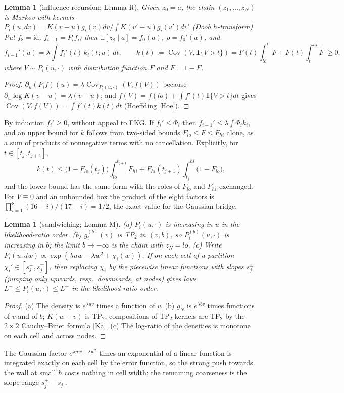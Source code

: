 \documentclass[11pt,a4paper]{article}
\newtheorem{lemma}[theorem]{Lemma}
\theoremstyle{definition}
\theoremstyle{remark}
\newcommand{\E}{\mathbb{E}}
\newcommand{\Cov}{\operatorname{Cov}}
\begin{document}
\begin{lemma}[influence recursion; Lemma R]\label{lem:R}
Given $z_0=a$, the chain $(z_1,\dots,z_N)$ is Markov with kernels $P_i(u,dv)=K(v-u)g_i(v)dv/\!\int K(v'-u)g_i(v')dv'$ \textup{(}Doob $h$-transform\textup{)}. Put $f_8=\mathrm{id}$, $f_{i-1}=P_if_i$; then $\E[z_8\mid a]=f_0(a)$, $\rho=f_0'(a)$, and
\[
f_{i-1}'(u)=\lambda\int f_i'(t)\,k_i(t;u)\,dt,\qquad k(t):=\Cov(V,\mathbf 1\{V>t\})=\bar F(t)\!\int_{lo}^{t}\!F+F(t)\!\int_t^{hi}\!\bar F\ \ge0 ,
\]
where $V\sim P_i(u,\cdot)$ with distribution function $F$ and $\bar F=1-F$.
\end{lemma}
\begin{proof}
$\partial_u(P_if)(u)=\lambda\Cov_{P_i(u,\cdot)}(V,f(V))$ because $\partial_u\log K(v-u)=\lambda(v-u)$; and $f(V)=f(lo)+\int f'(t)\mathbf 1\{V>t\}dt$ gives $\Cov(V,f(V))=\int f'(t)k(t)dt$ (Hoeffding [Hoe]).
\end{proof}
By induction $f_i'\ge0$, without appeal to FKG. If $f_i'\le\Phi_i$ then $f_{i-1}'\le\lambda\int\Phi_ik_i$, and an upper bound for $k$ follows from two-sided bounds $F_{lo}\le F\le F_{hi}$ alone, as a sum of products of nonnegative terms with no cancellation. Explicitly, for $t\in[t_j,t_{j+1}]$,
\[
k(t)\le\big(1-F_{lo}(t_j)\big)\int_{lo}^{t_{j+1}}F_{hi}+F_{hi}(t_{j+1})\int_{t_j}^{hi}\big(1-F_{lo}\big),
\]
and the lower bound has the same form with the roles of $F_{lo}$ and $F_{hi}$ exchanged. For $V\equiv0$ and an unbounded box the product of the eight factors is $\prod_{i=1}^8(16-i)/(17-i)=1/2$, the exact value for the Gaussian bridge.

\begin{lemma}[sandwiching; Lemma M]\label{lem:M}
\textup{(a)} $P_i(u,\cdot)$ is increasing in $u$ in the likelihood-ratio order. \textup{(b)} $g_i^{(b)}(v)$ is TP$_2$ in $(v,b)$, so $P_i^{(b)}(u,\cdot)$ is increasing in $b$; the limit $b\to-\infty$ is the chain with $z_N=lo$. \textup{(c)} Write $P_i(u,dw)\propto\exp(\lambda uw-\lambda w^2+\chi_i(w))$. If on each cell of a partition $\chi_i'\in[s_j^-,s_j^+]$, then replacing $\chi_i$ by the piecewise linear functions with slopes $s_j^\pm$ \textup{(}jumping only upwards, resp.\ downwards, at nodes\textup{)} gives laws $L^-\le P_i(u,\cdot)\le L^+$ in the likelihood-ratio order.
\end{lemma}
\begin{proof}
(a) The density is $e^{\lambda uv}$ times a function of $v$. (b) $g_N$ is $e^{\lambda bv}$ times functions of $v$ and of $b$; $K(w-v)$ is TP$_2$; compositions of TP$_2$ kernels are TP$_2$ by the $2\times2$ Cauchy--Binet formula [Ka]. (c) The log-ratio of the densities is monotone on each cell and across nodes.
\end{proof}
The Gaussian factor $e^{\lambda uw-\lambda w^2}$ times an exponential of a linear function is integrated exactly on each cell by the error function, so the strong push towards the wall at small $\hbar$ costs nothing in cell width; the remaining coarseness is the slope range $s_j^+-s_j^-$.
\end{document}
